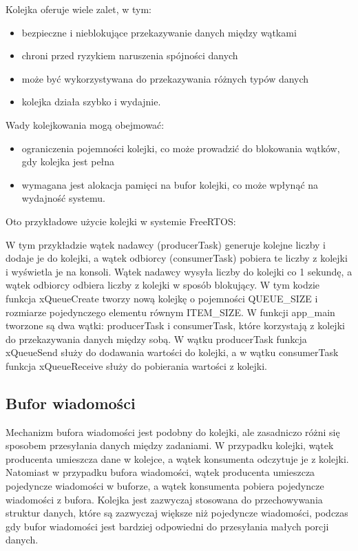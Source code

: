 Kolejka oferuje wiele zalet, w tym:
\begin{itemize}
    \item bezpieczne i nieblokujące przekazywanie danych między wątkami
    \item chroni przed ryzykiem naruszenia spójności danych
    \item może być wykorzystywana do przekazywania różnych typów danych
    \item kolejka działa szybko i wydajnie.
\end{itemize}
Wady kolejkowania mogą obejmować:
\begin{itemize}
    \item ograniczenia pojemności kolejki, co może prowadzić do blokowania wątków, gdy kolejka jest pełna
    \item wymagana jest alokacja pamięci na bufor kolejki, co może wpłynąć na wydajność systemu.\cite{butenhof2013programming}
\end{itemize}

Oto przykładowe użycie kolejki w systemie FreeRTOS:


W tym przykładzie wątek nadawcy (producerTask) generuje kolejne liczby i dodaje je do kolejki, a wątek odbiorcy (consumerTask) pobiera te liczby
z kolejki i wyświetla je na konsoli. Wątek nadawcy wysyła liczby do kolejki co 1 sekundę, a wątek odbiorcy odbiera liczby z kolejki w sposób blokujący.
W tym kodzie funkcja xQueueCreate tworzy nową kolejkę o pojemności QUEUE\_SIZE i rozmiarze pojedynczego elementu równym ITEM\_SIZE.
W funkcji app\_main tworzone są dwa wątki: producerTask i consumerTask, które korzystają z kolejki do przekazywania danych między sobą.
W wątku producerTask funkcja xQueueSend służy do dodawania wartości do kolejki, a w wątku consumerTask funkcja xQueueReceive służy
do pobierania wartości z kolejki.

\subsection{Bufor wiadomości}
Mechanizm bufora wiadomości jest podobny do kolejki, ale zasadniczo różni się sposobem przesyłania danych między zadaniami.
W przypadku kolejki, wątek producenta umieszcza dane w kolejce, a wątek konsumenta odczytuje je z kolejki. Natomiast w przypadku bufora wiadomości,
wątek producenta umieszcza pojedyncze wiadomości w buforze, a wątek konsumenta pobiera pojedyncze wiadomości z bufora.
Kolejka jest zazwyczaj stosowana do przechowywania struktur danych, które są zazwyczaj większe niż pojedyncze wiadomości,
podczas gdy bufor wiadomości jest bardziej odpowiedni do przesyłania małych porcji danych\cite{freertosbook}.

